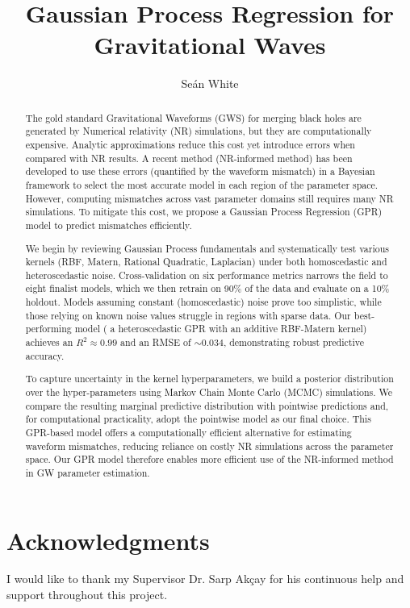 \documentclass{ucdgradtaughtthesis}
\title{Gaussian Process Regression for Gravitational Waves}
\author{Seán White}
\begin{document}
\pagestyle{plain}


\maketitle

\begin{abstract}
    The gold standard Gravitational Waveforms (GWS) for merging black holes are generated by Numerical relativity (NR) simulations, but they are computationally expensive. 
    Analytic approximations reduce this cost yet introduce errors when compared with NR results. A recent method (NR-informed method) has been developed to use these errors (quantified by the waveform mismatch) in a Bayesian framework to select the most accurate model in each region of the parameter space.
    However, computing mismatches across vast parameter domains still requires many NR simulations. To mitigate this cost, we propose a Gaussian Process Regression (GPR) model to predict mismatches efficiently.

    We begin by reviewing Gaussian Process fundamentals and systematically test various kernels (RBF, Matern, Rational Quadratic, Laplacian) under both homoscedastic and heteroscedastic noise. 
    Cross-validation on six performance metrics narrows the field to eight finalist models, which we then retrain on 90\% of the data and evaluate on a 10\% holdout. 
    Models assuming constant (homoscedastic) noise prove too simplistic, while those relying on known noise values struggle in regions with sparse data. 
    Our best-performing model ( a heteroscedastic GPR with an additive RBF-Matern kernel) achieves an \(R^2 \approx 0.99\) and an RMSE of \(\sim 0.034\), demonstrating robust predictive accuracy.

    To capture uncertainty in the kernel hyperparameters, we build a posterior distribution over the hyper-parameters using Markov Chain Monte Carlo (MCMC) simulations. 
    We compare the resulting marginal predictive distribution with pointwise predictions and, for computational practicality, adopt the pointwise model as our final choice. 
    This GPR-based model offers a computationally efficient alternative for estimating waveform mismatches, reducing reliance on costly NR simulations across the parameter space. 
    Our GPR model therefore enables more efficient use of the NR-informed method in GW parameter estimation.
\end{abstract}
    

\chapter*{Acknowledgments}
I would like to thank my Supervisor Dr. Sarp Ak\c{c}ay for his continuous help and support throughout this project.
\end{document}
